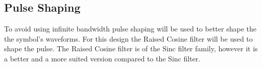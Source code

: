\documentclass[]{article}
\begin{document}
\subsection*{Pulse Shaping}
To avoid using infinite bandwidth pulse shaping will be used to better shape the the symbol's waveforms. For this design the Raised Cosine filter will be used to shape the pulse. The Raised Cosine filter is of the Sinc filter family, however it is a better and a more suited version compared to the Sinc filter.
\end{document}
